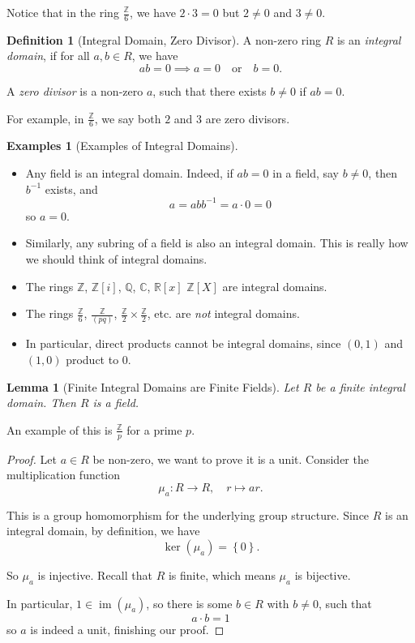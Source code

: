 \documentclass{article}
\newtheorem{lemma}[theorem]{Lemma}
\theoremstyle{definition}
\newtheorem{definition}[theorem]{Definition}
\newtheorem{examples}[theorem]{Examples}
\theoremstyle{remark}
\newcommand{\pqty}[1]{\left(#1\right)}
\newcommand{\bqty}[1]{\left[#1\right]}
\newcommand{\Bqty}[1]{\left\{#1\right\}}
\newcommand{\flatfrac}[2]{\frac{#1}{#2}}
\newcommand{\function}[5]{#1:#2\to #3,\quad #4\mapsto #5}
\newcommand{\qor}{\quad\text{or}\quad}
\newcommand{\inverse}{^{-1}}
\newcommand{\ZZ}{\mathbb{Z}}
\newcommand{\QQ}{\mathbb{Q}}
\newcommand{\RR}{\mathbb{R}}
\newcommand{\CC}{\mathbb{C}}
\newcommand{\img}{\operatorname{im}}
\begin{document}
Notice that in the ring \(\flatfrac{\ZZ}{6}\), we have \(2 \cdot 3 = 0\) but \(2 \neq 0\) and \(3 \neq 0\).

\begin{definition}[Integral Domain, Zero Divisor]
    \label{def:integral-domain-zero-divisor}%
    A non-zero ring \(R\) is an \emph{integral domain}, if for all \(a, b \in R\), we have
    \[
        a b = 0 \implies a = 0 \qor b = 0.
    \]

    A \emph{zero divisor} is a non-zero \(a\), such that there exists \(b \neq 0\) if \(ab = 0\).
\end{definition}

For example, in \(\flatfrac{\ZZ}{6}\), we say both \(2\) and \(3\) are zero divisors.

\begin{examples}[Examples of Integral Domains]
    \label{ex:integral-domain}%
    \begin{itemize}
        \item Any field is an integral domain. Indeed, if \(a b = 0\) in a field, say \(b \neq 0\), then \(b\inverse\) exists, and
    \[
        a = a b b\inverse = a \cdot 0 = 0
    \]
    so \(a = 0\).
        \item Similarly, any subring of a field is also an integral domain. This is really how we should think of integral domains.
        \item The rings \(\ZZ\), \(\ZZ\bqty{i}\), \(\QQ\), \(\CC\), \(\RR\bqty{x}\) \(\ZZ\bqty{X}\) are integral domains.
        \item The rings \(\flatfrac{\ZZ}{6}\), \(\flatfrac{\ZZ}{\pqty{pq}}\), \(\flatfrac{\ZZ}{2} \times \flatfrac{\ZZ}{2}\), etc. are \textit{not} integral domains.
        \item In particular, direct products cannot be integral domains, since \(\pqty{0, 1}\) and \(\pqty{1, 0}\) product to \(0\).
    \end{itemize}
\end{examples}

\begin{lemma}[Finite Integral Domains are Finite Fields]
    \label{lem:finite-integral-domain-finate-field}%
    Let \(R\) be a finite integral domain. Then \(R\) is a field.
\end{lemma}

An example of this is \(\flatfrac{\ZZ}{p}\) for a prime \(p\).

\begin{proof}
    Let \(a \in R\) be non-zero, we want to prove it is a unit. Consider the multiplication function
    \[
        \function{\mu_a}{R}{R}{r}{ar.}
    \]

    This is a group homomorphism for the underlying group structure. Since \(R\) is an integral domain, by definition, we have
    \[
        \ker \pqty{\mu_a} = \Bqty{0}.
    \]

    So \(\mu_a\) is injective. Recall that \(R\) is finite, which means \(\mu_a\) is bijective.

    In particular, \(1 \in \img \pqty{\mu_a}\), so there is some \(b \in R\) with \(b \neq 0\), such that
    \[
        a \cdot b = 1
    \]
    so \(a\) is indeed a unit, finishing our proof.
\end{proof}
\end{document}
